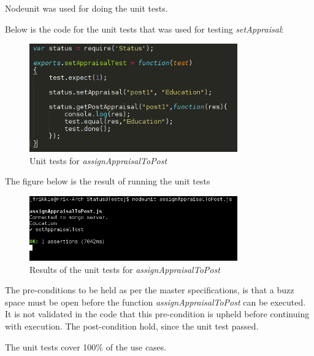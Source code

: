 \documentclass[a4paper,12pt]{article}
\begin{document}
Nodeunit was used for doing the unit tests.

Below is the code for the unit tests that was used for testing \textit{setAppraisal}:

	\begin{figure}[H]
		\centering
		\includegraphics[width=0.8\textwidth]{Figures/assignAppraisalToPost_unittest.png}
		\caption{Unit tests for \textit{assignAppraisalToPost}}
	\end{figure}
	
The figure below is the result of running the unit tests


	\begin{figure}[H]
		\centering
		\includegraphics[width=0.8\textwidth]{Figures/assignAppraisalToPost_result.png}
		\caption{Results of the unit tests for \textit{assignAppraisalToPost}}
	\end{figure}

The pre-conditions to be held as per the master specifications, is that a buzz space must be open before the function \textit{assignAppraisalToPost} can be executed. It is not validated in the code that this pre-condition is upheld before continuing with execution. The post-condition hold, since the unit test passed.

The unit tests cover 100\% of the use cases.
\end{document}
